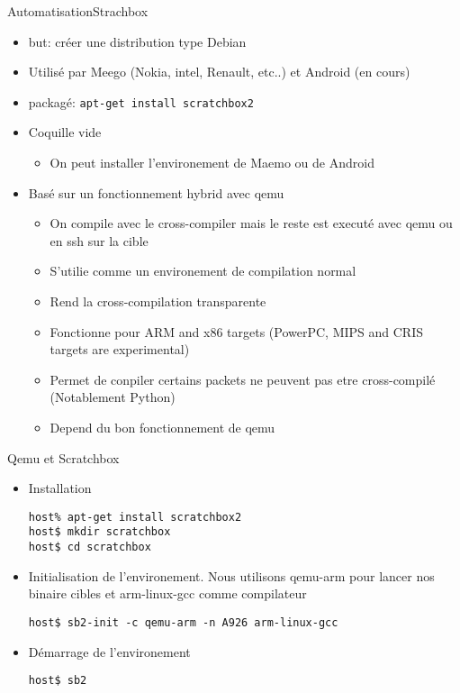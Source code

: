 \begin{frame}[fragile=singleslide]{Automatisation}{Strachbox}
  \begin{itemize}
  \item but: créer une distribution type Debian
  \item Utilisé  par Meego (Nokia,  intel, Renault, etc..)  et Android
    (en cours)
  \item packagé: \verb+apt-get install scratchbox2+
  \item Coquille vide
    \begin{itemize}
    \item On peut installer l'environement de Maemo ou de Android
    \end{itemize}
  \item Basé sur un fonctionnement hybrid avec qemu
    \begin{itemize}
    \item On compile avec le  cross-compiler mais le reste est executé
      avec qemu ou en ssh sur la cible
    \item S'utilie comme un environement de compilation normal
    \item Rend la cross-compilation transparente
    \item Fonctionne pour ARM and  x86 targets (PowerPC, MIPS and CRIS
      targets are experimental)
    \item  Permet de  conpiler certains  packets ne  peuvent  pas etre
      cross-compilé (Notablement Python)
    \item Depend du bon fonctionnement de qemu
    \end{itemize}
  \end{itemize}
\end{frame}

\begin{frame}[fragile=singleslide]{Qemu et Scratchbox}
  \begin{itemize}
  \item Installation
    \begin{lstlisting}
host% apt-get install scratchbox2
host$ mkdir scratchbox
host$ cd scratchbox
    \end{lstlisting}
  \item Initialisation de l'environement. Nous utilisons qemu-arm pour
    lancer nos binaire cibles et arm-linux-gcc comme compilateur
    \begin{lstlisting}
host$ sb2-init -c qemu-arm -n A926 arm-linux-gcc
    \end{lstlisting}
  \item Démarrage de l'environement
    \begin{lstlisting}
host$ sb2
    \end{lstlisting}
  \end{itemize}
\end{frame}

